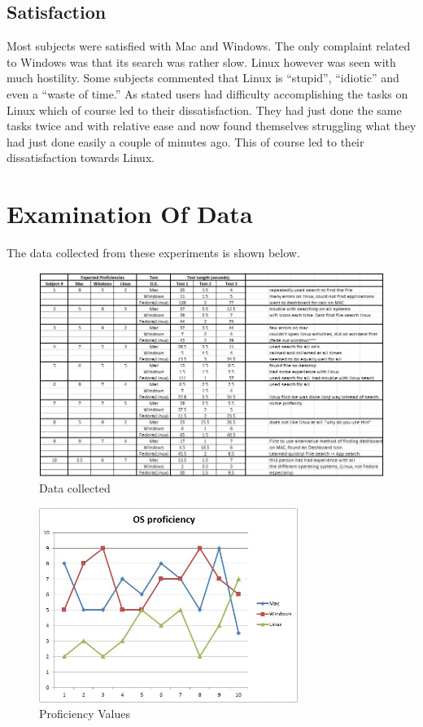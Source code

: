 \documentclass[11pt]{article}
\begin{document}
\subsection{Satisfaction}
Most subjects were satisfied with Mac and Windows. The only complaint related to Windows was that its search was rather slow. Linux however was seen with much hostility. Some subjects commented that Linux is “stupid”, “idiotic” and even a “waste of time.” As stated users had difficulty accomplishing the tasks on Linux which of course led to their dissatisfaction. They had just done the same tasks twice and with relative ease and now found themselves struggling what they had just done easily a couple of minutes ago. This of course led to their dissatisfaction towards Linux.

\section{Examination Of Data}
The data collected from these experiments is shown below.

\begin{figure}[h!]
  \centering
    \includegraphics[width= 1\textwidth]{./Images/Data_table}
  \caption{Data collected}
\end{figure}

\begin{figure}[h!]
  \centering
    \includegraphics[width=0.75\textwidth]{./Images/Proficiency}
  \caption{Proficiency Values}
\end{figure}
\end{document}
